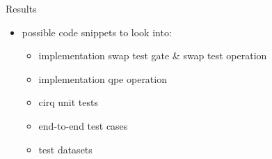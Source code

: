 \begin{frame}[title-small={color=hpiorange, bg=none, text=Results}]
	\maketitle
\end{frame}


\begin{frame}{Results}
  \begin{minipage}{1.0\textwidth}
		\begin{itemize}
			\item possible code snippets to look into:
	    \begin{itemize}
				\item implementation swap test gate \& swap test operation
				\item implementation qpe operation
				\item cirq unit tests
				\item end-to-end test cases
				\item test datasets
			\end{itemize}
		\end{itemize}
  \end{minipage}
\end{frame}
